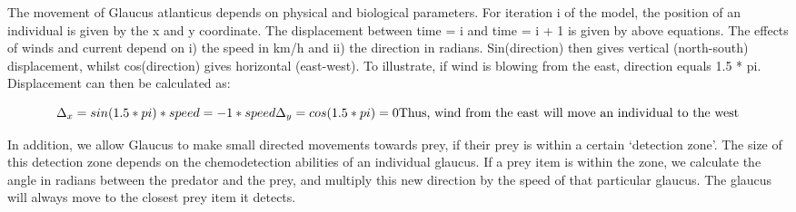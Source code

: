 \documentclass[
]{article}
\begin{document}
The movement of Glaucus atlanticus depends on physical and biological
parameters. For iteration i of the model, the position of an individual
is given by the x and y coordinate. The displacement between time = i
and time = i + 1 is given by above equations. The effects of winds and
current depend on i) the speed in km/h and ii) the direction in radians.
Sin(direction) then gives vertical (north-south) displacement, whilst
cos(direction) gives horizontal (east-west). To illustrate, if wind is
blowing from the east, direction equals 1.5 * pi. Displacement can then
be calculated as:

\[
\Delta_{x} = sin(1.5 * pi) * speed = -1*speed \\
\Delta_{y} = cos(1.5*pi) = 0 \\
\text{Thus, wind from the east will move an individual to the west}
\]

In addition, we allow Glaucus to make small directed movements towards
prey, if their prey is within a certain `detection zone'. The size of
this detection zone depends on the chemodetection abilities of an
individual glaucus. If a prey item is within the zone, we calculate the
angle in radians between the predator and the prey, and multiply this
new direction by the speed of that particular glaucus. The glaucus will
always move to the closest prey item it detects.
\end{document}
